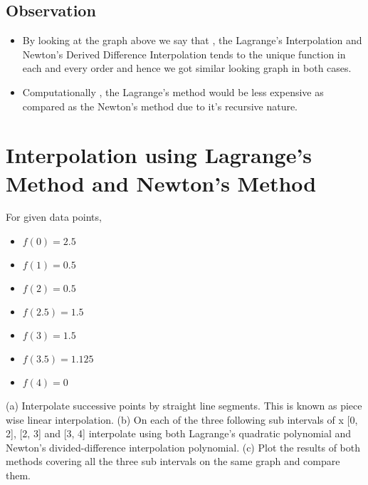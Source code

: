 \documentclass{article}
\begin{document}
\subsection{Observation}
\begin{itemize}
   \item By looking at the graph above we say that , the Lagrange's Interpolation and Newton's Derived Difference Interpolation tends to the unique function in each and every order and hence we got similar looking graph in both cases.
   \item Computationally , the Lagrange's method would be less expensive as compared as the Newton's method due to it's recursive nature.
\end{itemize}

\section{Interpolation using Lagrange's Method and Newton's Method}
For given data points,
\begin{itemize}
    \item $f(0) = 2.5$
    \item $f(1) = 0.5$
    \item $f(2) = 0.5$
    \item $f(2.5) = 1.5$
    \item $f(3) = 1.5$
    \item $f(3.5) = 1.125$
    \item $f(4) = 0$
\end{itemize}
(a) Interpolate successive points by straight line segments. This is known as piece wise linear interpolation.
(b) On each of the three following sub intervals of x [0, 2], [2, 3] and [3, 4] interpolate using both Lagrange’s quadratic polynomial and Newton’s divided-difference interpolation polynomial.
(c) Plot the results of both methods covering all the three sub intervals on the same graph and compare them.
\end{document}

